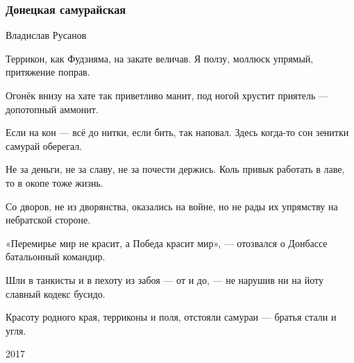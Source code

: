 
 
 

\subsubsection{Донецкая самурайская}
\label{sec:poetry.rus.dnr.vladislav_rusanov.donetskaja_samurajskaja}

Владислав Русанов

Террикон, как Фудзияма,
на закате величав.
Я ползу, моллюск упрямый,
притяжение поправ.

Огонёк внизу на хате
так приветливо манит,
под ногой хрустит приятель —
допотопный аммонит.

Если на кон --- всё до нитки,
если бить, так наповал.
Здесь когда-то сон зенитки
самурай оберегал.

Не за деньги, не за славу,
не за почести держись.
Коль привык работать в лаве,
то в окопе тоже жизнь.

Со дворов, не из дворянства,
оказались на войне,
но не рады их упрямству
на небратской стороне.

«Перемирье мир не красит,
а Победа красит мир», —
отозвался о Донбассе
батальонный командир.

Шли в танкисты и в пехоту
из забоя --- от и до, —
не нарушив ни на йоту
славный кодекс бусидо.

Красоту родного края,
терриконы и поля,
отстояли самураи —
братья стали и угля.

2017 
